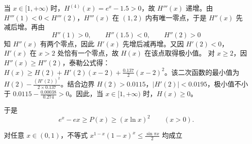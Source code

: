 \begin{solution}
当 $x \in [1, +\infty)$ 时，$H^{(4)}(x) = e^x - 1.5 > 0$，故 $H'''(x)$ 递增。由 $H'''(1) < 0 < H'''(2)$，$H'''(x)$ 在 $(1,2)$ 内有唯一零点，于是 $H''(x)$ 先减后增。再由
\[
H''(1) > 0,\qquad H''(1.5) < 0,\qquad H''(2) > 0
\]
知 $H''(x)$ 有两个零点，因此 $H'(x)$ 先增后减再增。又因 $H'(2) < 0$，$H'(x)$ 在 $x > 2$ 处恰有一个零点，故 $H(x)$ 在该点取得极小值。
对 $x \ge 2$，因 $H''(x) \ge H''(2)$，泰勒公式得：$H(x) \ge H(2) + H'(2)(x-2) + \frac{0.137}{2}(x-2)^2$。该二次函数的最小值为 $H(2) - \frac{(H'(2))^2}{2 \times 0.137}$。结合边界 $H(2) > 0.0115$，$|H'(2)| < 0.0195$，极小值不小于 $0.0115 - \frac{0.00038}{0.274}  > 0$。因此，当 $x \in [1, +\infty)$ 时，$H(x) \ge 0$。

于是
\[
e^x-ex\ge P(x)\ge (x\ln x)^2\qquad (x>0).
\]
\end{solution}

\begin{example}
对任意 $x \in (0, 1)$，不等式 $x^{1-x}(1-x)^x\le \frac{\sin\pi x}{2}$ 均成立
\end{example}
